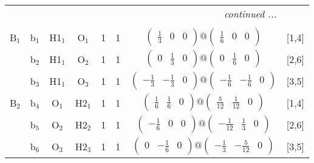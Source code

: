 \documentclass[fleqn,10pt,landscape]{article}
\begin{document}
\begin{itemize}
\begin{center}
\begin{longtable}{cc|cc|c|c|c|l}
 \hline \hline
\multicolumn{7}{r}{\footnotesize\it continued ...} \\ \endfoot

 \hline \hline
\multicolumn{7}{r}{} \\ \endlastfoot

B$_{1}$ & b$_{1}$ & H1$_{1}$ & O$_{1}$ & 1 & 1 & $\begin{pmatrix} \frac{1}{3} & 0 & 0 \end{pmatrix}@\begin{pmatrix} \frac{1}{6} & 0 & 0 \end{pmatrix}$ & [1,4] \\
& b$_{2}$ & H1$_{1}$ & O$_{2}$ & 1 & 1 & $\begin{pmatrix} 0 & \frac{1}{3} & 0 \end{pmatrix}@\begin{pmatrix} 0 & \frac{1}{6} & 0 \end{pmatrix}$ & [2,6] \\
& b$_{3}$ & H1$_{1}$ & O$_{3}$ & 1 & 1 & $\begin{pmatrix} - \frac{1}{3} & - \frac{1}{3} & 0 \end{pmatrix}@\begin{pmatrix} - \frac{1}{6} & - \frac{1}{6} & 0 \end{pmatrix}$ & [3,5] \\ \hline
B$_{2}$ & b$_{4}$ & O$_{1}$ & H2$_{1}$ & 1 & 1 & $\begin{pmatrix} \frac{1}{6} & \frac{1}{6} & 0 \end{pmatrix}@\begin{pmatrix} \frac{5}{12} & \frac{1}{12} & 0 \end{pmatrix}$ & [1,4] \\
& b$_{5}$ & O$_{2}$ & H2$_{2}$ & 1 & 1 & $\begin{pmatrix} - \frac{1}{6} & 0 & 0 \end{pmatrix}@\begin{pmatrix} - \frac{1}{12} & \frac{1}{3} & 0 \end{pmatrix}$ & [2,6] \\
& b$_{6}$ & O$_{3}$ & H2$_{3}$ & 1 & 1 & $\begin{pmatrix} 0 & - \frac{1}{6} & 0 \end{pmatrix}@\begin{pmatrix} - \frac{1}{3} & - \frac{5}{12} & 0 \end{pmatrix}$ & [3,5] \\
\end{longtable}
\end{center}


\end{itemize}
\end{document}
